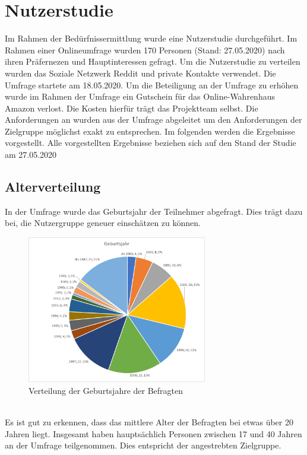 \section{Nutzerstudie}
Im Rahmen der Bedürfnissermittlung wurde eine Nutzerstudie durchgeführt. Im Rahmen einer Onlineumfrage wurden 170 Personen (Stand: 27.05.2020) nach ihren Präfernezen und Hauptinteressen gefragt.
Um die Nutzerstudie zu verteilen wurden das Soziale Netzwerk Reddit und private Kontakte verwendet. Die Umfrage startete am 18.05.2020. Um die Beteiligung an der Umfrage zu erhöhen wurde im Rahmen der Umfrage ein Gutschein für das Online-Wahrenhaus Amazon verlost. Die Kosten hierfür trägt das Projektteam selbst.
Die Anforderungen an \softwarename wurden aus der Umfrage abgeleitet um den Anforderungen der Zielgruppe möglichst exakt zu entsprechen.
Im folgenden werden die Ergebnisse vorgestellt.
Alle vorgestellten Ergebnisse beziehen sich auf den Stand der Studie am 27.05.2020\\

\subsection{Alterverteilung}
In der Umfrage wurde das Geburtsjahr der Teilnehmer abgefragt. Dies trägt dazu bei, die Nutzergruppe geneuer einschätzen zu können.
\\
\begin{figure}[h]
    \centering
    \includegraphics[width=0.7\textwidth]{media/diagram/geburtsjahr.png}
    \caption{Verteilung der Geburtsjahre der Befragten}
\end{figure}
\\
Es ist gut zu erkennen, dass das mittlere Alter der Befragten bei etwas über 20 Jahren liegt. Insgesamt haben hauptsächlich Personen zwischen 17 und 40 Jahren an der Umfrage teilgenommen.
Dies entspricht der angestrebten Zielgruppe.
